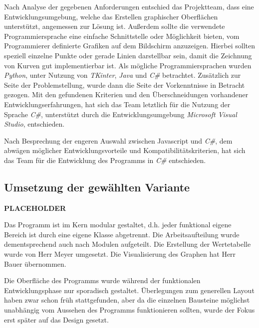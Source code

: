 \documentclass{article}
\begin{document}
    Nach Analyse der gegebenen Anforderungen entschied das Projektteam, dass eine Entwicklungsumgebung, welche das Erstellen graphischer Oberflächen unterstützt, angemessen zur Lösung ist. Außerdem sollte die verwendete Programmiersprache eine einfache Schnittstelle oder Möglichkeit bieten, vom Programmierer definierte Grafiken auf dem Bildschirm anzuzeigen. Hierbei sollten speziell einzelne Punkte oder gerade Linien darstellbar sein, damit die Zeichnung von Kurven gut implementierbar ist.
    Als mögliche Programmiersprachen wurden \textit{\glqq Python\grqq{}}, unter Nutzung von \textit{\glqq TKinter\grqq{}}, \textit{\glqq Java\grqq{}} und \textit{\glqq C\#\grqq{}} betrachtet.
    Zusätzlich zur Seite der Problemstellung, wurde dann die Seite der Vorkenntnisse in Betracht gezogen. Mit den gefundenen Kriterien und den Überschneidungen vorhandener Entwicklungserfahrungen, hat sich das Team letztlich für die Nutzung der Sprache \textit{\glqq C\#\grqq{}}, unterstützt durch die Entwicklungsumgebung \textit{\glqq Microsoft Visual Studio\grqq{}}, entschieden.

    Nach Besprechung der engeren Auswahl zwischen Javascript und \textit{\glqq C\#\grqq{}}, dem abwägen möglicher Entwicklungsvorteile und Kompatibilitätskriterien, hat sich das Team für die Entwicklung des Programms in \textit{\glqq C\#\grqq{}} entschieden.

\subsection{Umsetzung der gewählten Variante}

    \textbf{PLACEHOLDER}%

    Das Programm ist im Kern modular gestaltet, d.h. jeder funktional eigene Bereich ist durch eine eigene Klasse abgetrennt.
    Die Arbeitsaufteilung wurde dementsprechend auch nach Modulen aufgeteilt.
    Die Erstellung der Wertetabelle wurde von Herr Meyer umgesetzt.
    Die Visualisierung des Graphen hat Herr Bauer übernommen.

    Die Oberfläche des Programms wurde während der funktionalen Entwicklungsphase nur sporadisch gestaltet.
    Überlegungen zum generellen Layout haben zwar schon früh stattgefunden, aber da die einzelnen Bausteine möglichst unabhängig vom Aussehen des Programms funktionieren sollten, wurde der Fokus erst später auf das Design gesetzt.
\end{document}
